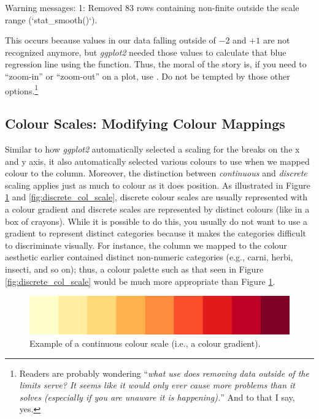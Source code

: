 \begin{outR}
Warning messages:
1: Removed 83 rows containing non-finite outside the scale range
(`stat_smooth()`). 
\end{outR}

\noindent
This occurs because values in our data falling outside of $-2$ and $+1$ are not recognized anymore, but \textit{ggplot2} needed those values to calculate that blue regression line using the  function. Thus, the moral of the story is, if you need to ``zoom-in'' or ``zoom-out'' on a plot, use . Do not be tempted by those other options.\footnote{Readers are probably wondering ``\textit{what use does removing data outside of the limits serve? It seems like it would only ever cause more problems than it solves (especially if you are unaware it is happening).}'' And to that I say, yes.}

\subsection{Colour Scales: Modifying Colour Mappings}

Similar to how \textit{ggplot2} automatically selected a scaling for the breaks on the x and y axis, it also automatically selected various colours to use when we mapped colour to the  column. Moreover, the distinction between \textit{continuous} and \textit{discrete} scaling applies just as much to colour as it does position. As illustrated in Figure \ref{fig:continuous_col_scale} and \ref{fig:discrete_col_scale}, discrete colour scales are usually represented with a colour gradient and discrete scales are represented by distinct colours (like in a box of crayons). While it is possible to do this, you usually do not want to use a gradient to represent distinct categories because it makes the categories difficult to discriminate visually. For instance, the  column we mapped to the colour aesthetic earlier contained distinct non-numeric categories (e.g., carni, herbi, insecti, and so on); thus, a colour palette such as that seen in Figure \ref{fig:discrete_col_scale} would be much more appropriate than Figure \ref{fig:continuous_col_scale}.

\vspace{2em}

\begin{figure}[h]
\centering
\includegraphics[scale = .4]{graphics/ch2Figs/col_gradient.pdf}
\caption{Example of a continuous colour scale (i.e., a colour gradient).}
\label{fig:continuous_col_scale}
\end{figure}

